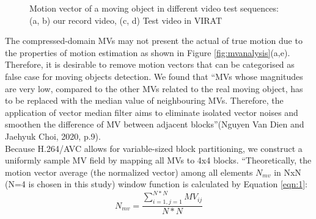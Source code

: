 \begin{figure}
{}
\caption{Motion vector of a moving object in different video test sequences: (a, b) our record video, (c, d) Test video in VIRAT}
\label{fig:mvobject}
\end{figure}
The compressed-domain MVs may not present the actual of true motion due to the properties of motion estimation as shown in Figure \ref{fig:mvanalysis}(a,e). Therefore, it is desirable to remove motion vectors that can be categorised as false case for moving objects detection. We found that “MVs  whose magnitudes are very low, compared to the other MVs related to the real moving object, has to be replaced with the median value of neighbouring MVs. Therefore, the application of vector median filter aims to eliminate isolated vector noises and smoothen the difference of MV between adjacent blocks”(Nguyen Van Dien and Jaehyuk Choi, 2020, p.9). \\ Because H.264/AVC allows for variable-sized block partitioning, we construct a uniformly sample MV field by mapping all MVs to 4x4 blocks. “Theoretically, the motion vector average (the normalized vector) among all elements $N_{mv}$ in NxN (N=4 is chosen in this study) window function is calculated by Equation \ref{eqn:1}: 
\begin{equation}
\label{eqn:1}
N_{mv}= \frac{\sum_{i=1, j=1}^{N*N}MV_{ij}}{N*N}
\end{equation}          
